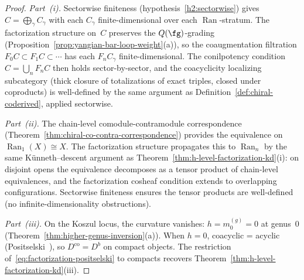 \begin{proof}
\emph{Part~(i).}
Sectorwise finiteness (hypothesis~\ref{h2:sectorwise}) gives
$C = \bigoplus_{\gamma} C_\gamma$ with each $C_\gamma$
finite-dimensional over each $\operatorname{Ran}$-stratum.
The factorization structure on~$C$ preserves the
$Q(\fg)$-grading (Proposition~\ref{prop:yangian-bar-loop-weight}(a)),
so the coaugmentation filtration
$F_0 C \subset F_1 C \subset \cdots$ has each
$F_n C_\gamma$ finite-dimensional.  The conilpotency condition
$C = \bigcup_n F_n C$ then holds sector-by-sector, and the
coacyclicity localizing subcategory (thick closure of totalizations
of exact triples, closed under coproducts) is well-defined
by the same argument as
Definition~\ref{def:chiral-coderived}, applied sectorwise.

\emph{Part~(ii).}
The chain-level comodule-contramodule correspondence
(Theorem~\ref{thm:chiral-co-contra-correspondence}) provides the
equivalence on
$\operatorname{Ran}_1(X) \cong X$.  The factorization structure
propagates this to $\operatorname{Ran}_n$ by the same
K\"unneth--descent argument as
Theorem~\ref{thm:h-level-factorization-kd}(i):
on disjoint opens the equivalence decomposes as a tensor product
of chain-level equivalences, and the factorization cosheaf
condition extends to overlapping configurations.  Sectorwise
finiteness ensures the tensor products are well-defined
(no infinite-dimensionality obstructions).

\emph{Part~(iii).}
On the Koszul locus, the curvature vanishes:
$h = m_0^{(g)} = 0$ at genus~$0$
(Theorem~\ref{thm:higher-genus-inversion}(a)).  When $h = 0$,
coacyclic = acyclic (Positselski~\cite[Thm~3.7]{Positselski11}),
so $D^{\mathrm{co}} = D^b$ on compact objects.  The restriction
of~\eqref{eq:factorization-positselski} to compacts recovers
Theorem~\ref{thm:h-level-factorization-kd}(iii).
\end{proof}

